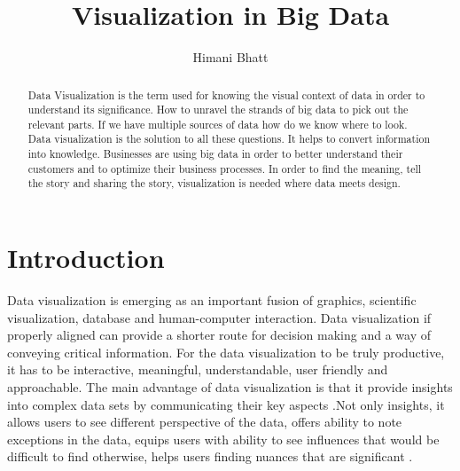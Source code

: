 

%


\title{Visualization in Big Data}


\author{Himani Bhatt}



\renewcommand{\shortauthors}{H. Bhatt}



\begin{abstract}
Data Visualization is the term used for knowing the visual context of data in order to understand its significance. How to unravel the strands of big data to pick out the relevant parts. If we have multiple sources of data how do we know where to look. Data visualization is the solution to all these questions. It helps to convert information into knowledge. Businesses are using big data in order to better understand their customers and to optimize their business processes. In order to find the meaning, tell the story and sharing the story, visualization is needed where data meets design.
\end{abstract}


\maketitle

\section{Introduction} 

Data visualization is emerging as an important fusion of graphics, scientific visualization, database and human-computer interaction. Data visualization if properly aligned can provide a shorter route for decision making and a way of conveying critical information. For the data visualization to be truly productive, it has to be interactive, meaningful, understandable, user friendly and approachable. The main advantage of data visualization is that it provide insights into complex data sets by communicating their key aspects \cite{Intro01}.Not only insights, it allows users to see different perspective of the data, offers ability to note exceptions in the data, equips users with ability to see influences that would be difficult to find otherwise, helps users finding nuances that are significant \cite{Intro02}. \\

